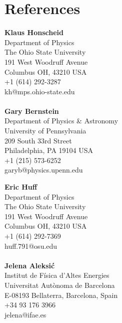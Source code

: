 \documentclass[12pt,a4paper,sans]{moderncv}	%
\begin{document}
\section{References}
\begin{minipage}{0.48\textwidth}
\textbf{Klaus Honscheid} \\
Department of Physics \\
The Ohio State University \\
191 West Woodruff Avenue \\
Columbus OH, 43210 USA \\
+1 (614) 292-3287 \\
kh@mps.ohio-state.edu \\
\\
\textbf{Gary Bernstein} \\
Department of Physics \& Astronomy \\
University of Pennsylvania \\
209 South 33rd Street \\
Philadelphia, PA 19104 USA \\ 
+1 (215) 573-6252 \\
garyb@physics.upenn.edu
\end{minipage}%
%
\begin{minipage}{0.48\textwidth}
\textbf{Eric Huff} \\
Department of Physics \\
The Ohio State University \\
191 West Woodruff Avenue \\
Columbus OH, 43210 USA \\
+1 (614) 292-7369 \\
huff.791@osu.edu \\
\\
\textbf{Jelena Aleksi\'c} \\
Institut de F\'isica d'Altes Energies \\
Universitat Aut\`onoma de Barcelona \\
E-08193 Bellaterra, Barcelona, Spain \\
+34 93 176 3966 \\
jelena@ifae.es \\
\end{minipage}


\end{document}
